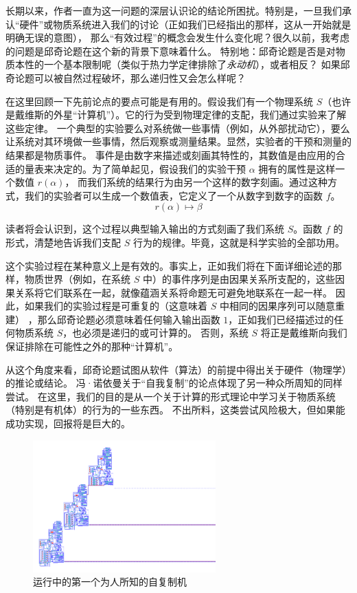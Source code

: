 \documentclass[a4paper,12pt]{article}
\begin{document}
长期以来，作者一直为这一问题的深层认识论的结论所困扰\cite{RosenR1962}。特别是，一旦我们承认“硬件”或物质系统进入我们的讨论（正如我们已经指出的那样，这从一开始就是明确无误的意图），
那么“有效过程”的概念会发生什么变化呢？很久以前\cite{RosenR1962}，我考虑的问题是邱奇论题在这个新的背景下意味着什么。
特别地：邱奇论题是否是对物质本性的一个基本限制呢（类似于热力学定律排除了\emph{永动机}），或者相反？ 如果邱奇论题可以被自然过程破坏，那么递归性又会怎么样呢？

在这里回顾一下先前论点的要点可能是有用的。假设我们有一个物理系统 $S$（也许是戴维斯的外星“计算机”）。它的行为受到物理定律的支配，我们通过实验来了解这些定律。
一个典型的实验要么对系统做一些事情（例如，从外部扰动它），要么让系统对其环境做一些事情，然后观察或测量结果。显然，实验者的干预和测量的结果都是物质事件。
事件是由数字来描述或刻画其特性的，其数值是由应用的合适的量表来决定的\cite{RosenR1978}。为了简单起见，假设我们的实验干预 $\alpha$ 拥有的属性是这样一个数值 $r(\alpha)$，
而我们系统的结果行为由另一个这样的数字刻画。通过这种方式，我们的实验者可以生成一个数值表，它定义了一个从数字到数字的函数 $f$。 \begin{equation} r(\alpha) \mapsto \beta\end{equation}

读者将会认识到，这个过程以典型输入输出的方式刻画了我们系统 $S$。函数 $f$ 的形式，清楚地告诉我们支配 $S$ 行为的规律。毕竟，这就是科学实验的全部功用。

这个实验过程在某种意义上是有效的。事实上，正如我们将在下面详细论述的那样，物质世界（例如，在系统 $S$ 中）的事件序列是由因果关系所支配的，这些因果关系将它们联系在一起，就像蕴涵关系将命题无可避免地联系在一起一样。
因此，如果我们的实验过程是可重复的（这意味着 $S$ 中相同的因果序列可以随意重建） ，那么邱奇论题必须意味着任何输入输出函数 $1$，正如我们已经描述过的任何物质系统 $S$，也必须是递归的或可计算的。
否则，系统 $S$ 将正是戴维斯向我们保证排除在可能性之外的那种“计算机”。

从这个角度来看，邱奇论题试图从软件（算法）的前提中得出关于硬件（物理学）的推论或结论。
冯·诺依曼关于“自我复制”的论点\cite{BurksA1966}体现了另一种众所周知的同样尝试。
在这里，我们的目的是从一个关于计算的形式理论中学习关于物质系统（特别是有机体）的行为的一些东西。
不出所料，这类尝试风险极大，但如果能成功实现，回报将是巨大的。

\begin{figure}[ht]
\centering
\includegraphics[height=2.0in]{images/self_reprod.png}
\caption{运行中的第一个为人所知的自复制机}
\end{figure}
\end{document}
